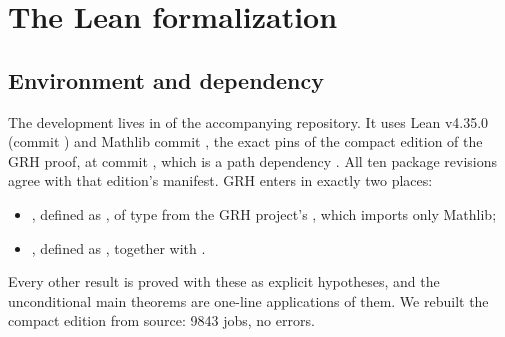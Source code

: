 \section{The Lean formalization}\label{sec:formal}

\subsection{Environment and dependency}
The development lives in  of the accompanying repository. It uses Lean v4.35.0 (commit ) and
Mathlib commit , the exact pins of the compact edition of the GRH proof,
 at commit , which is a path dependency \cite{grhlean}. All
ten package revisions agree with that edition's manifest. GRH enters in exactly two places:
\begin{itemize}
\item {}, defined as , of type
  from the GRH project's , which imports only Mathlib;
\item {}, defined as , together with
  .
\end{itemize}
Every other result is proved with these as explicit hypotheses, and the unconditional main theorems are
one-line applications of them. We rebuilt the compact edition from source: 9843 jobs, no errors.

